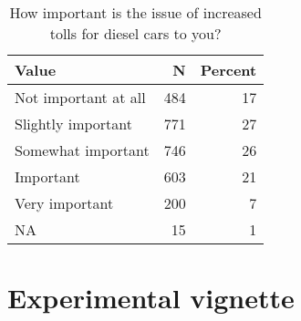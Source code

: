 \documentclass[
]{book}
\begin{document}
\begin{table}[H]

\caption{\label{tab:unnamed-chunk-2}How important is the issue of increased tolls for diesel cars to you?}
\centering
\begin{tabular}[t]{lrr}
\toprule
Value & N & Percent\\
\midrule
Not important at all & 484 & 17\\
Slightly important & 771 & 27\\
Somewhat important & 746 & 26\\
Important & 603 & 21\\
Very important & 200 & 7\\
NA & 15 & 1\\
\bottomrule
\end{tabular}
\end{table}

\hypertarget{experimental-vignette-2}{%
\section{Experimental vignette}\label{experimental-vignette-2}}
\end{document}

